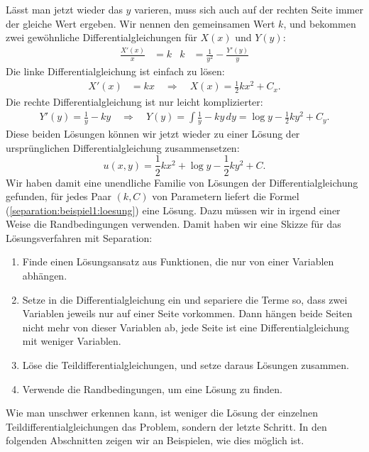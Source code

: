 Lässt man jetzt wieder das $y$ varieren, muss sich auch auf der rechten
Seite immer der gleiche Wert ergeben. Wir nennen den gemeinsamen Wert
$k$, und bekommen zwei gewöhnliche Differentialgleichungen
für $X(x)$ und $Y(y)$:
\begin{align}
\frac{X'(x)}{x}&=k
&
k&=\frac1{y^2}-\frac{Y'(y)}{y}
\label{separation:beispiel1:separiertedgl}
\end{align}
Die linke Differentialgleichung ist einfach zu lösen:
\begin{align*}
X'(x)&=kx\quad\Rightarrow\quad X(x)=
\frac12kx^2+C_x.
\end{align*}
Die rechte Differentialgleichung ist nur leicht komplizierter:
\begin{align*}
Y'(y)=\frac1y-ky
\quad\Rightarrow\quad
Y(y)=\int\frac1y-ky\,dy=
\log y-\frac12ky^2+C_y.
\end{align*}
Diese beiden Lösungen können wir jetzt wieder zu einer Lösung der
ursprünglichen Differentialgleichung zusammensetzen:
\begin{equation}
u(x,y)=
\frac12kx^2+
\log y-\frac12ky^2+C.
\label{separation:beispiel1:loesung}
\end{equation}
Wir haben damit eine unendliche Familie von Lösungen der
Differentialgleichung gefunden, für jedes Paar $(k,C)$ von
Parametern liefert die Formel (\ref{separation:beispiel1:loesung})
eine Lösung.
Dazu müssen wir in irgend einer Weise die Randbedingungen verwenden.
Damit haben wir eine Skizze für das Lösungsverfahren mit Separation:
\begin{enumerate}
\item Finde einen Lösungsansatz aus Funktionen, die nur von einer
Variablen abhängen.
\item Setze in die Differentialgleichung ein und separiere die Terme
so, dass zwei Variablen jeweils nur auf einer Seite vorkommen. Dann
hängen beide Seiten nicht mehr von dieser Variablen ab, jede Seite
ist eine Differentialgleichung mit weniger Variablen.
\item Löse die Teildifferentialgleichungen, und setze daraus 
Lösungen zusammen. 
\item Verwende die Randbedingungen, um eine Lösung zu finden.
\end{enumerate}
Wie man unschwer erkennen kann, ist weniger die Lösung der
einzelnen Teildifferentialgleichungen das Problem, sondern der letzte
Schritt. In den folgenden Abschnitten zeigen wir an Beispielen, wie
dies möglich ist.


